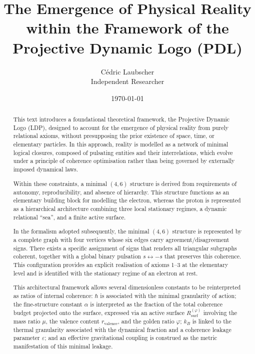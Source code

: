 \documentclass[11pt,a4paper]{article}
\title{\textbf{The Emergence of Physical Reality within the Framework of the Projective Dynamic Logo (PDL)}}
\author{Cédric Laubscher \\ \small Independent Researcher}
\date{\today}
\begin{document}
\maketitle

\begin{abstract}

This text introduces a foundational theoretical framework, the Projective Dynamic Logo (LDP), designed to account for the emergence of physical reality from purely relational axioms, without presupposing the prior existence of space, time, or elementary particles. In this approach, reality is modelled as a network of minimal logical closures, composed of pulsating entities and their interrelations, which evolve under a principle of coherence optimisation rather than being governed by externally imposed dynamical laws.

Within these constraints, a minimal \((4,6)\) structure is derived from requirements of autonomy, reproducibility, and absence of hierarchy. This structure functions as an elementary building block for modelling the electron, whereas the proton is represented as a hierarchical architecture combining three local stationary regimes, a dynamic relational “sea”, and a finite active surface.

In the formalism adopted subsequently, the minimal \((4,6)\) structure is represented by a complete graph with four vertices whose six edges carry agreement/disagreement signs. There exists a specific assignment of signs that renders all triangular subgraphs coherent, together with a global binary pulsation \(s \leftrightarrow -s\) that preserves this coherence. This configuration provides an explicit realisation of axioms 1–3 at the elementary level and is identified with the stationary regime of an electron at rest.

This architectural framework allows several dimensionless constants to be reinterpreted as ratios of internal coherence: \(\hbar\) is associated with the minimal granularity of action; the fine-structure constant \(\alpha\) is interpreted as the fraction of the total coherence budget projected onto the surface, expressed via an active surface \(R_{\mathrm{surf}}^{(\varphi)}\) involving the mass ratio \(\mu\), the valence content \(r_{\mathrm{valence}}\), and the golden ratio \(\varphi\); \(k_{B}\) is linked to the thermal granularity associated with the dynamical fraction and a coherence leakage parameter \(\varepsilon\); and an effective gravitational coupling is construed as the metric manifestation of this minimal leakage.


\end{abstract}
\end{document}
